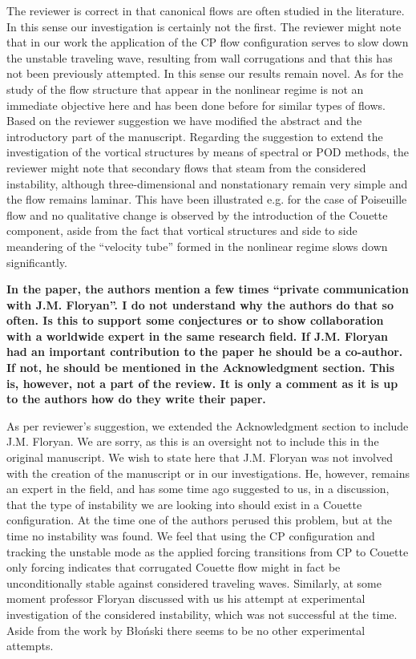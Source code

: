 \documentclass[a4paper,12pt]{article}
\begin{document}
\vspace*{20pt}
The reviewer is correct in that canonical flows are often studied in the literature.
In this sense our investigation is certainly not the first.
The reviewer might note that in our work the application of the CP flow configuration serves to slow down the unstable traveling wave, resulting from wall corrugations and that this has not been previously attempted. In this sense our results remain novel. As for the study of the flow structure that appear in the nonlinear regime is not an immediate objective here and has been done before for similar types of flows. Based on the reviewer suggestion we have modified the abstract and the introductory part of the manuscript. Regarding the suggestion to extend the investigation of the vortical structures by means of spectral or POD methods, the reviewer might note that secondary flows that steam from the considered instability, although three-dimensional and nonstationary remain very simple and the flow remains laminar. This have been illustrated e.g. for the case of Poiseuille flow and no qualitative change is observed by the introduction of the Couette component, aside from the fact that vortical structures and side to side meandering of the “velocity tube” formed in the nonlinear regime slows down significantly. 
\vspace*{20pt}

{\bf In the paper, the authors mention a few times “private communication with J.M. Floryan”. I do not understand why the authors do that so often. Is this to support some conjectures or to show collaboration with a worldwide expert in the same research field. If J.M. Floryan had an important contribution to the paper he should be a co-author. If not, he should be mentioned in the Acknowledgment section. This is, however, not a part of the review. It is only a comment as it is up to the authors how do they write their paper.}

\vspace*{20pt}
As per reviewer’s suggestion, we extended the Acknowledgment section to include J.M. Floryan. We are sorry, as this is an oversight not to include this in the original manuscript. We wish to state here that J.M. Floryan was not involved with the creation of the manuscript or in our investigations. He, however, remains an expert in the field, and has some time ago suggested to us, in a discussion, that the type of instability we are looking into should exist in a Couette configuration. At the time one of the authors perused this problem, but at the time no instability was found. We feel that using the CP configuration and tracking the unstable mode as the applied forcing transitions from CP to Couette only forcing indicates that corrugated Couette flow might in fact be unconditionally stable against considered traveling waves. Similarly, at some moment professor Floryan discussed with us his attempt at experimental investigation of the considered instability, which was not successful at the time. Aside from the work by Błoński there seems to be no other experimental attempts. 
\vspace*{20pt}
\end{document}
